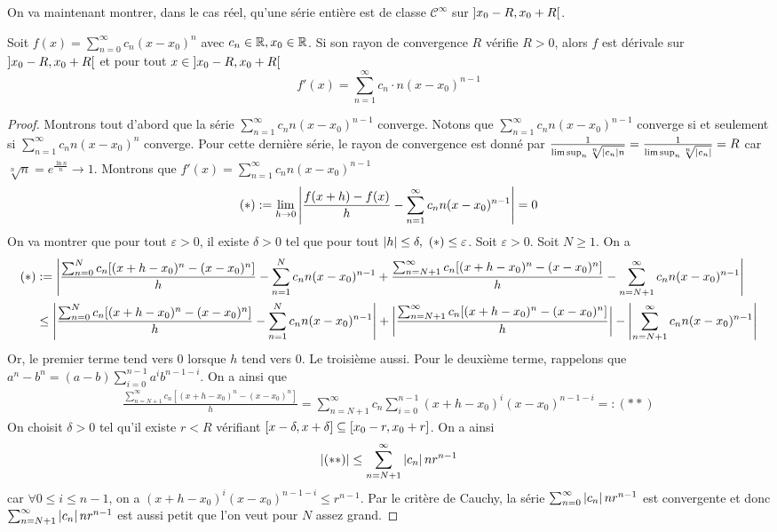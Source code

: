 On va maintenant montrer, dans le cas réel, qu'une série entière est de classe $\mathcal C^\infty$ sur $\left] x_0 - R, x_0 + R\right[$. 
\begin{proposition}
    Soit $f(x) = \sum_{n = 0}^\infty c_n(x-x_0)^n$ avec $c_n\in\mathbb{R},x_0\in \mathbb{R}$. Si son rayon de convergence $R$ vérifie $R>0$, alors $f$ est dérivale sur  $\left] x_0 - R, x_0 + R\right[$ et pour tout $x\in\left] x_0 - R, x_0 + R\right[$ $$f'(x) = \sum_{n = 1}^\infty c_n\cdot n(x-x_0)^{n-1}$$
\end{proposition}
\begin{proof}
    Montrons tout d'abord que la série $\sum_{n=1}^\infty c_n n (x-x_0)^{n-1}$ converge. Notons que $\sum_{n=1}^\infty c_n n (x-x_0)^{n-1}$ converge si et seulement si $\sum_{n=1}^\infty c_n n (x-x_0)^{n}$ converge. Pour cette dernière série, le rayon de convergence est donné par $\frac{1}{\limsup_n\sqrt[n]{\left| c_n \right|n}} = \frac{1}{\limsup_n\sqrt[n]{\left| c_n \right|}} = R$
    car $\sqrt[n]{n} = e^{\frac{\ln n}n} \to 1$.
    Montrons que $f'(x) = \sum_{ n = 1}^\infty c_n n (x-x_0)^{n-1}$ \ie $$(*):=\lim_{h\to 0}\left| \frac{f(x+h) - f(x)}{h} - \sum_{ n = 1}^\infty c_n n (x-x_0)^{n-1} \right| = 0$$
    On va montrer que pour tout $\varepsilon>0$, il existe $\delta >0$ tel que pour tout $\left| h \right|\le \delta,\ (*)\le \varepsilon$.
    Soit $\varepsilon > 0$. Soit $N\ge 1$.
    On a \begin{align*}
        (*) &:=\left| \frac{ \sum_{n = 0}^N c_n[(x+h-x_0)^n - (x-x_0)^n]}{h} - \sum_{ n =1}^N c_n n (x-x_0)^{n-1} + \frac{ \sum_{n = N + 1}^\infty c_n[(x+h-x_0)^n - (x-x_0)^n]}{h} - \sum_{ n =N+1}^\infty c_n n (x-x_0)^{n-1} \right|\\
        &\le \left| \frac{ \sum_{n = 0}^N c_n[(x+h-x_0)^n - (x-x_0)^n]}{h} - \sum_{ n =1}^N c_n n (x-x_0)^{n-1} \right| + \left| \frac{ \sum_{n = N + 1}^\infty c_n[(x+h-x_0)^n - (x-x_0)^n]}{h} \right| - \left| \sum_{ n =N+1}^\infty c_n n (x-x_0)^{n-1} \right|
    \end{align*}
    Or, le premier terme tend vers $0$ lorsque $h$ tend vers $0$. Le troisième aussi. Pour le deuxième terme, rappelons que $a^n - b^n = (a-b)\sum_{i = 0}^{n-1}a^ib^{n-1-i}$. On a ainsi que \begin{align*}
        \frac{ \sum_{n = N + 1}^\infty c_n[(x+h-x_0)^n - (x-x_0)^n]}{h} = \sum_{n = N+1}^\infty c_n\sum_{i = 0}^{n-1}(x+h-x_0)^i(x-x_0)^{n-1-i} =: (**)
    \end{align*}
    On choisit $\delta > 0$ tel qu'il existe $r<R$ vérifiant $\left[ x-\delta,x + \delta\right]\subseteq \left[ x_0-r, x_0+r\right]$. On a ainsi 
    \begin{align*}
        \left| (**) \right|\le \sum_{n  = N+1}^\infty\left| c_n \right| n r^{n-1}
    \end{align*}
    car $\forall 0\le i\le n-1$, on a $(x+h-x_0)^i(x-x_0)^{n-1-i}\le r^{n-1}$. Par le critère de Cauchy, la série $\sum_{n  = 0}^\infty\left| c_n \right| n r^{n-1}$ est convergente et donc $\sum_{n  = N+1}^\infty\left| c_n \right| n r^{n-1}$ est aussi petit que l'on veut pour $N$ assez grand.
\end{proof}
